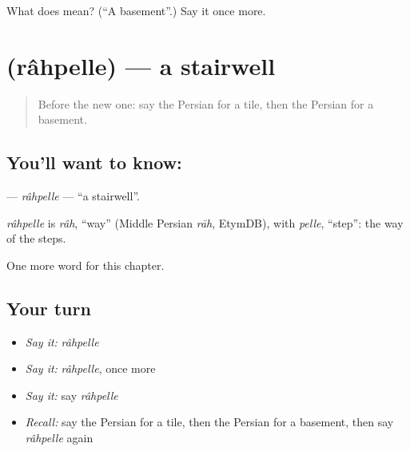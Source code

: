 \begin{tcolorbox}[breakable,colback=teal!4,colframe=teal!35!black,title={Before you move on}]
What does  mean? (\textquotedblleft{}A basement\textquotedblright{}.) Say it once more.
\end{tcolorbox}
\section[\texorpdfstring{\fa{راه} \fa{پله} (râhpelle)}{راه پله (râhpelle)}]{  (râhpelle) — a stairwell}

\label{lesson:FA-C232-rahpelle}



\begin{quote}
Before the new one: say the Persian for a tile, then the Persian for a basement.
\end{quote}

\subsection*{You'll want to know:  }
\textbf{ } — \emph{râhpelle} — \textquotedblleft{}a stairwell\textquotedblright{}.

\begin{cousinweb}
\emph{râhpelle} is \emph{râh}, \textquotedblleft{}way\textquotedblright{} (Middle Persian \emph{rāh}, EtymDB), with \emph{pelle}, \textquotedblleft{}step\textquotedblright{}: the way of the steps.
\end{cousinweb}

\begin{grammarlens}[title={What you've built}]
One more word for this chapter.
\end{grammarlens}

\subsection*{Your turn}
\begin{itemize}
\raggedright
  \item \emph{Say it:} \emph{râhpelle}
  \item \emph{Say it:} \emph{râhpelle}, once more
  \item \emph{Say it:} say \emph{râhpelle}
  \item \emph{Recall:} say the Persian for a tile, then the Persian for a basement, then say \emph{râhpelle} again
\end{itemize}

